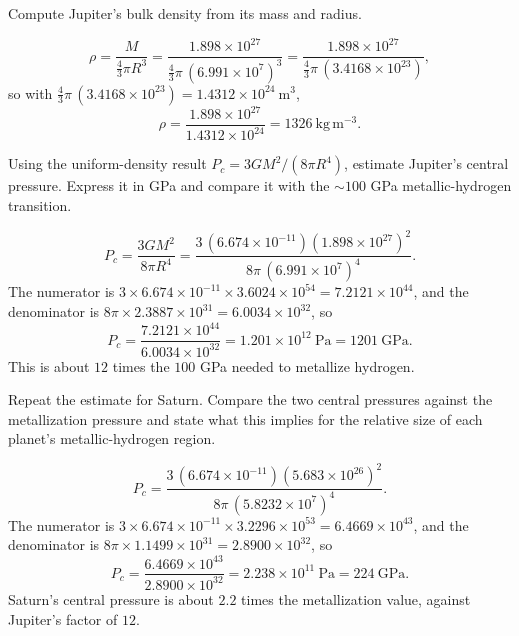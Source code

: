 \parti Compute Jupiter's bulk density from its mass and radius.

\begin{solution}
\[
\rho = \frac{M}{\tfrac{4}{3}\pi R^3}
= \frac{1.898\times10^{27}}{\tfrac{4}{3}\pi\,(6.991\times10^{7})^3}
= \frac{1.898\times10^{27}}{\tfrac{4}{3}\pi\,(3.4168\times10^{23})},
\]
so with $\tfrac{4}{3}\pi\,(3.4168\times10^{23}) = 1.4312\times10^{24}\ \mathrm{m^3}$,
\[
\rho = \frac{1.898\times10^{27}}{1.4312\times10^{24}} = 1326\ \mathrm{kg\,m^{-3}}.
\]
\end{solution}

\parti Using the uniform-density result $P_c = 3GM^2/(8\pi R^4)$, estimate Jupiter's central pressure. Express it in GPa and compare it with the $\sim 100$ GPa metallic-hydrogen transition.

\begin{solution}
\[
P_c = \frac{3GM^2}{8\pi R^4}
= \frac{3\,(6.674\times10^{-11})(1.898\times10^{27})^2}{8\pi\,(6.991\times10^{7})^4}.
\]
The numerator is $3 \times 6.674\times10^{-11} \times 3.6024\times10^{54} = 7.2121\times10^{44}$, and the denominator is $8\pi \times 2.3887\times10^{31} = 6.0034\times10^{32}$, so
\[
P_c = \frac{7.2121\times10^{44}}{6.0034\times10^{32}} = 1.201\times10^{12}\ \mathrm{Pa} = 1201\ \mathrm{GPa}.
\]
This is about $12$ times the $100$ GPa needed to metallize hydrogen.
\end{solution}

\parti Repeat the estimate for Saturn. Compare the two central pressures against the metallization pressure and state what this implies for the relative size of each planet's metallic-hydrogen region.

\begin{solution}
\[
P_c = \frac{3\,(6.674\times10^{-11})(5.683\times10^{26})^2}{8\pi\,(5.8232\times10^{7})^4}.
\]
The numerator is $3 \times 6.674\times10^{-11} \times 3.2296\times10^{53} = 6.4669\times10^{43}$, and the denominator is $8\pi \times 1.1499\times10^{31} = 2.8900\times10^{32}$, so
\[
P_c = \frac{6.4669\times10^{43}}{2.8900\times10^{32}} = 2.238\times10^{11}\ \mathrm{Pa} = 224\ \mathrm{GPa}.
\]
Saturn's central pressure is about $2.2$ times the metallization value, against Jupiter's factor of $12$.
\end{solution}

